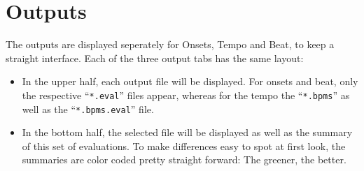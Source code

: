 \section{Outputs}
The outputs are displayed seperately for Onsets, Tempo and Beat, to keep a
straight interface. Each of the three output tabs has the same layout:

\begin{itemize}
  \item In the upper half, each output file will be displayed. For onsets and
  beat, only the respective ``\texttt{*.eval}'' files appear, whereas for the
  tempo the ``\texttt{*.bpms}'' as well as the ``\texttt{*.bpms.eval}'' file.
  \item In the bottom half, the selected file will be displayed as well as the
  summary of this set of evaluations. To make differences easy to spot at first
  look, the summaries are color coded pretty straight forward: The greener, the
  better.
\end{itemize}
